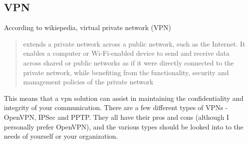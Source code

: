 \subsection{VPN}
According to wikiepedia, virtual private network (VPN)
\begin{quote}
extends a private network across a public network, such as the Internet. It enables a computer or Wi-Fi-enabled device to send and receive data across shared or public networks as if it were directly connected to the private network, while benefiting from the functionality, security and management policies of the private network
\end{quote}
This means that a vpn solution can assist in maintaining the confidentiality and integrity of your communication.
There are a few different types of VPNs - OpenVPN, IPSec and PPTP. They all have their pros and cons (although I personally prefer OpenVPN), and the various types should be looked into to  the needs of yourself or your organization.